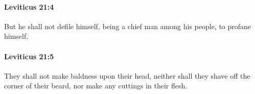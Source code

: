		\paragraph{Leviticus 21:4} %
			\label{LEVITICUS-21-4}

			But he shall not defile himself, being a chief man among his people, to profane himself.


		\paragraph{Leviticus 21:5} %
			\label{LEVITICUS-21-5}

			They shall not make baldness upon their head, neither shall they shave off the corner of their beard, nor make any cuttings in their flesh.


